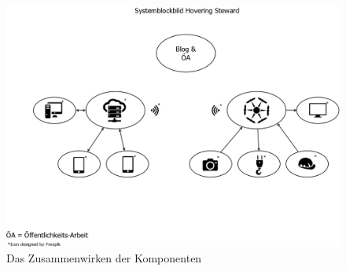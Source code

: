 \begin{figure}[tbh]
\begin{centering}
\includegraphics[angle = 90, width = \textwidth]{Bilder/Systemblockbild}
\par\end{centering}
\caption{Das Zusammenwirken der Komponenten}
\label{Systemblockbild}
\end{figure}